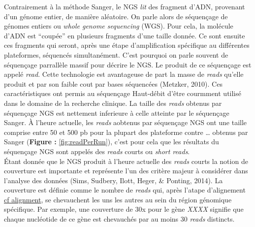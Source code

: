 \documentclass[12pt,twoside]{reedthesis}
\theoremstyle{definition}
\theoremstyle{definition}
\theoremstyle{remark}
\begin{document}
  Contrairement à la méthode Sanger, le NGS \emph{lit} des fragment d'ADN,
  provenant d'un génome entier, de manière aléatoire. On parle alors de
  séquençage de génomes entiers ou \emph{whole genome sequencing} (WGS).
  Pour cela, la molécule d'ADN est ``coupée'' en plusieurs fragments d'une
  taille donnée. Ce sont ensuite ces fragments qui seront, après une étape
  d'amplification spécifique au différentes plateformes, séquencés
  simultanément. C'est pourquoi on parle souvent de séquençage parrallèle
  massif pour décrire le NGS. Le produit de ce séquençage est appelé
  \emph{read}. Cette technologie est avantageuse de part la masse de
  \emph{reads} qu'elle produit et par son faible cout par bases séquencées
  (Metzker, 2010). Ces caractéristiques ont permis au séquençage
  Haut-débit d'être courmment utilisé dans le domaine de la recherche
  clinique. La taille des \emph{reads} obtenus par séquençage NGS est
  nettement inferieure à celle atteinte par le séquençage Sanger. À
  l'heure actuelle, les \emph{reads} aobtenus par séquençage NGS ont une
  taille comprise entre 50 et 500 pb pour la plupart des plateforme contre
  \ldots{} obtenus par Sanger (\textbf{Figure :} \ref{fig:readPerRun}),
  c'est pour cela que les résultats du séquençage NGS sont appelés des
  \emph{reads} courts ou \emph{short reads}.\\
  Étant donnée que le NGS produit à l'heure actuelle des \emph{reads}
  courts la notion de couverture est importante et représente l'un des
  critère majeur à considérer dans l'analyse des données (Sims, Sudbery,
  Ilott, Heger, \& Ponting, 2014). La couverture est définie comme le
  nombre de \emph{reads} qui, après l'atape d'alignement
  \protect\hyperlink{lalignement}{cf alignment}, se chevauchent les uns
  les autres au sein du région génomique spécifique. Par exemple, une
  couverture de 30x pour le gène \emph{XXXX} signifie que chaque
  nucléotide de ce gène est chevauchés par au moins 30 \emph{reads}
  distincts.
  
\end{document}
